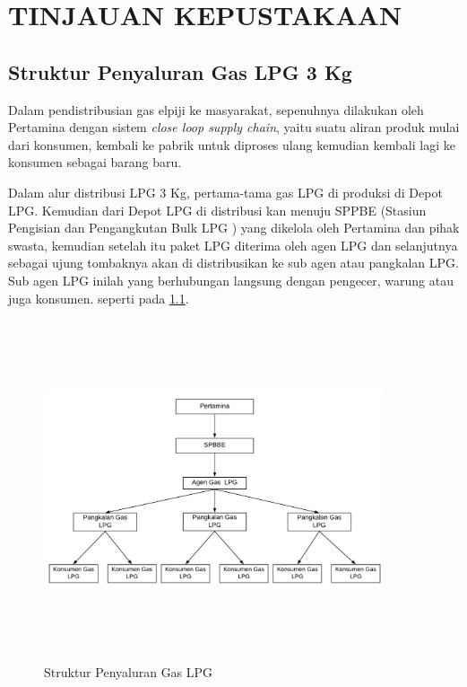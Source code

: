 
\chapter{TINJAUAN KEPUSTAKAAN}                

\section{Struktur Penyaluran Gas LPG 3 Kg}
\par Dalam pendistribusian gas elpiji ke masyarakat, sepenuhnya dilakukan oleh Pertamina dengan sistem \textit{close loop  supply chain}, yaitu suatu aliran produk mulai dari konsumen, kembali ke pabrik untuk diproses ulang kemudian kembali lagi ke konsumen sebagai barang baru.
\par Dalam alur distribusi LPG 3 Kg, pertama-tama gas LPG di produksi di Depot LPG. Kemudian dari Depot LPG di distribusi kan menuju SPPBE (Stasiun Pengisian dan Pengangkutan Bulk LPG ) yang dikelola oleh Pertamina dan pihak swasta, kemudian setelah itu paket LPG diterima oleh agen LPG dan selanjutnya sebagai ujung tombaknya akan di distribusikan ke sub agen atau pangkalan LPG. Sub agen LPG inilah yang berhubungan langsung dengan pengecer, warung atau juga konsumen. seperti pada \ref{penyaluran}.
\begin{figure}[H]
	\centering
	\includegraphics [width = 10cm, height= 10cm]{gambar/struktur-penyaluran}
	\caption{Struktur Penyaluran Gas LPG}
	\label{penyaluran}
\end{figure}


